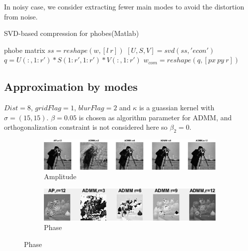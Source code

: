 \documentclass{article}
\numberwithin{equation}{section}
\begin{document}
\begin{enumerate}[leftmargin=*,listparindent=20pt]
In noisy case, we consider extracting fewer main modes to avoid the distortion from noise.
\begin{algorithm}
    \caption{SVD-based compression for phobes(Matlab)}
    \label{alg:compression}
    phobe matrix $ss = reshape(w,[l\ r])$ \;
    $[U,S,V] = svd(ss,'econ')$ \;
    $q = U(:,1:r')*S(1:r',1:r')*V(:,1:r')$ \;
    $w_{com} = reshape(q,[px \ py \  r])$ \;
   
\end{algorithm}
\end{enumerate}

\subsection{Approximation by modes}
$Dist=8$, $gridFlag=1$, $blurFlag=2$ and $\kappa$ is a guassian kernel with $\sigma = (15,15)$. $\beta=0.05$ is chosen as algorithm parameter for ADMM, and orthogonalization constraint is not considered here so $\beta_2 = 0$.



\begin{figure}[H]
\centering
\caption{}
\begin{subfigure}{1\textwidth}
    \centering
    \includegraphics[width=0.9\linewidth]{../figures/modes_u.eps}  
   \caption{Amplitude}
    \label{fig:modes_u}
 \end{subfigure}
 \begin{subfigure}{1\textwidth}
    \centering
    \includegraphics[width=.9\linewidth]{../figures/modes_u_phaze.png}  
    \caption{Phase}
    \label{fig:modes_u_phaze}
 \end{subfigure}
 
    \label{fig:modes_images}

 \end{figure}
 
\end{document}
